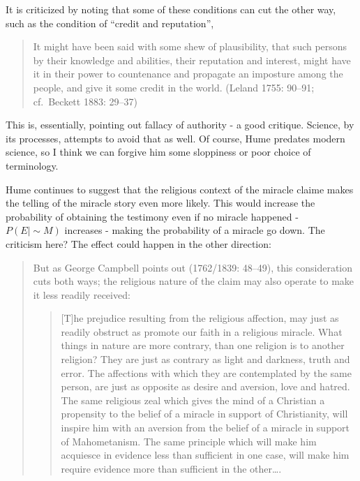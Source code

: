 It is criticized by noting that some of these conditions can cut the
other way, such as the condition of ``credit and reputation'',

\begin{quote}
It might have been said with some shew of plausibility, that such
persons by their knowledge and abilities, their reputation and interest,
might have it in their power to countenance and propagate an imposture
among the people, and give it some credit in the world. (Leland 1755:
90--91; cf.~Beckett 1883: 29--37)
\end{quote}

This is, essentially, pointing out fallacy of authority - a good
critique. Science, by its processes, attempts to avoid that as well. Of
course, Hume predates modern science, so I think we can forgive him some
sloppiness or poor choice of terminology.

Hume continues to suggest that the religious context of the miracle
claime makes the telling of the miracle story even more likely. This
would increase the probability of obtaining the testimony even if no
miracle happened - \(P(E|\sim\!M)\) increases - making the probability
of a miracle go down. The criticism here? The effect could happen in the
other direction:

\begin{quote}
But as George Campbell points out (1762/1839: 48--49), this
consideration cuts both ways; the religious nature of the claim may also
operate to make it less readily received:

\begin{quote}
{[}T{]}he prejudice resulting from the religious affection, may just as
readily obstruct as promote our faith in a religious miracle. What
things in nature are more contrary, than one religion is to another
religion? They are just as contrary as light and darkness, truth and
error. The affections with which they are contemplated by the same
person, are just as opposite as desire and aversion, love and hatred.
The same religious zeal which gives the mind of a Christian a propensity
to the belief of a miracle in support of Christianity, will inspire him
with an aversion from the belief of a miracle in support of
Mahometanism. The same principle which will make him acquiesce in
evidence less than sufficient in one case, will make him require
evidence more than sufficient in the other\ldots{}.
\end{quote}
\end{quote}

